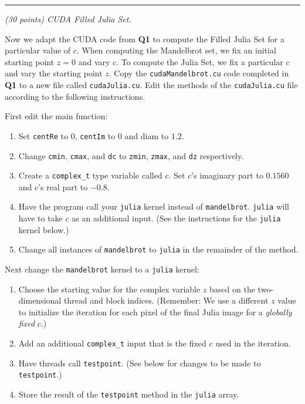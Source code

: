 \documentclass{article}
\newcommand{\myhrule}{ \begin{center}\rule{.9\linewidth}{.25mm}\end{center} }
\newcommand{\pad}{\vspace{8pt}\noindent}
\begin{document}
\newpage
\myhrule

\pad {\bf Q2} {\it (30 points) CUDA Filled Julia Set.}
\vspace{8pt} 

\noindent Now we adapt the CUDA code from \textbf{Q1} to compute the Filled Julia Set for a particular value of $c$. When computing the Mandelbrot set, we fix an initial starting point $z = 0$ and vary $c$. To compute the Julia Set, we fix a particular $c$ and vary the starting point $z$. Copy the \verb|cudaMandelbrot.cu| code completed in \textbf{Q1} to a new file called \verb|cudaJulia.cu|. Edit the methods of the \verb|cudaJulia.cu| file according to the following instructions. 
\vspace{1em}

\noindent First edit the main function:
\begin{enumerate}
    \item Set \texttt{centRe} to $0$, \texttt{centIm} to $0$ and diam to $1.2$.
    \item Change \texttt{cmin}, \texttt{cmax}, and \texttt{dc} to \texttt{zmin}, \texttt{zmax}, and \texttt{dz} respectively. 
    \item Create a \texttt{complex\_t} type variable called $c$. Set $c$'s imaginary part to $0.1560$ and $c$'s real part to $-0.8$.
    \item Have the program call your \texttt{julia} kernel instead of \texttt{mandelbrot}. \texttt{julia} will have to take $c$ as an additional input. (See the instructions for the \texttt{julia} kernel below.)
    \item Change all instances of \texttt{mandelbrot} to \texttt{julia} in the remainder of the method.
\end{enumerate}
\vspace{1em}


\noindent Next change the \texttt{mandelbrot} kernel to a \texttt{julia} kernel:
\begin{enumerate}
    \item Choose the starting value for the complex variable $z$ based on the two-dimensional thread and block indices.  (Remember: We use a different $z$ value to initialize the iteration for each pixel of the final Julia image for a \emph{globally fixed} $c$.) 
    \item Add an additional \texttt{complex\_t} input that is the fixed $c$ used in the iteration. 
    \item Have threads call \texttt{testpoint}. (See below for changes to be made to \texttt{testpoint}.)
    \item Store the result of the \texttt{testpoint} method in the \texttt{julia} array. 
\end{enumerate}
\vspace{1em}
\end{document}
